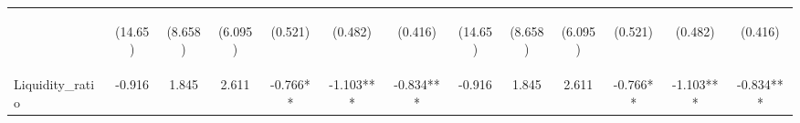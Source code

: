 \documentclass[]{article}
\begin{document}
\begin{center}
\begin{tabular}{lcccccccccccc}
\vspace{4pt} & \begin{footnotesize}(14.65)\end{footnotesize} & \begin{footnotesize}(8.658)\end{footnotesize} & \begin{footnotesize}(6.095)\end{footnotesize} & \begin{footnotesize}(0.521)\end{footnotesize} & \begin{footnotesize}(0.482)\end{footnotesize} & \begin{footnotesize}(0.416)\end{footnotesize} & \begin{footnotesize}(14.65)\end{footnotesize} & \begin{footnotesize}(8.658)\end{footnotesize} & \begin{footnotesize}(6.095)\end{footnotesize} & \begin{footnotesize}(0.521)\end{footnotesize} & \begin{footnotesize}(0.482)\end{footnotesize} & \begin{footnotesize}(0.416)\end{footnotesize} \\
Liquidity\_ratio & -0.916 & 1.845 & 2.611 & -0.766** & -1.103*** & -0.834*** & -0.916 & 1.845 & 2.611 & -0.766** & -1.103*** & -0.834*** \\

\end{tabular}
\end{center}
\end{document}
